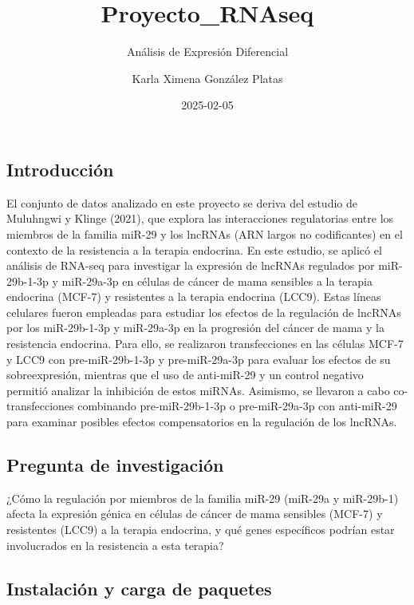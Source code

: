 \documentclass[
]{article}
\title{Proyecto\_RNAseq}
\subtitle{Análisis de Expresión Diferencial}
\author{Karla Ximena González Platas}
\date{2025-02-05}
\begin{document}
\maketitle

{
\setcounter{tocdepth}{2}
\tableofcontents
}
\subsection{Introducción}\label{introducciuxf3n}

El conjunto de datos analizado en este proyecto se deriva del estudio de
Muluhngwi y Klinge (2021), que explora las interacciones regulatorias
entre los miembros de la familia miR-29 y los lncRNAs (ARN largos no
codificantes) en el contexto de la resistencia a la terapia endocrina.
En este estudio, se aplicó el análisis de RNA-seq para investigar la
expresión de lncRNAs regulados por miR-29b-1-3p y miR-29a-3p en células
de cáncer de mama sensibles a la terapia endocrina (MCF-7) y resistentes
a la terapia endocrina (LCC9). Estas líneas celulares fueron empleadas
para estudiar los efectos de la regulación de lncRNAs por los
miR-29b-1-3p y miR-29a-3p en la progresión del cáncer de mama y la
resistencia endocrina. Para ello, se realizaron transfecciones en las
células MCF-7 y LCC9 con pre-miR-29b-1-3p y pre-miR-29a-3p para evaluar
los efectos de su sobreexpresión, mientras que el uso de anti-miR-29 y
un control negativo permitió analizar la inhibición de estos miRNAs.
Asimismo, se llevaron a cabo co-transfecciones combinando
pre-miR-29b-1-3p o pre-miR-29a-3p con anti-miR-29 para examinar posibles
efectos compensatorios en la regulación de los lncRNAs.

\subsection{Pregunta de
investigación}\label{pregunta-de-investigaciuxf3n}

¿Cómo la regulación por miembros de la familia miR-29 (miR-29a y
miR-29b-1) afecta la expresión génica en células de cáncer de mama
sensibles (MCF-7) y resistentes (LCC9) a la terapia endocrina, y qué
genes específicos podrían estar involucrados en la resistencia a esta
terapia?

\subsection{Instalación y carga de
paquetes}\label{instalaciuxf3n-y-carga-de-paquetes}
\end{document}
